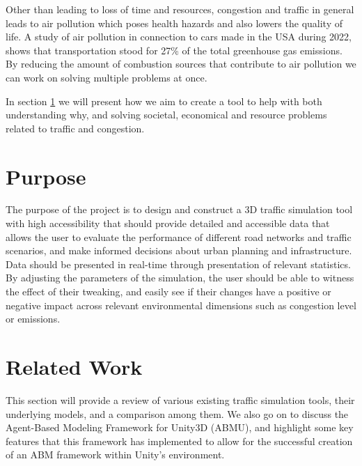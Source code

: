     Other than leading to loss of time and resources, congestion and traffic in general leads to air pollution which poses health hazards and also lowers the quality of life\cite{urban_2004}. A study of air pollution in connection to cars made in the USA during 2022, shows that transportation stood for 27\% of the total greenhouse gas emissions\cite{treehugger_2022}. By reducing the amount of combustion sources that contribute to air pollution we can work on solving multiple problems at once.

    In section \ref{purpose} we will present how we aim to create a tool to help with both understanding why, and solving societal, economical and resource problems related to traffic and congestion.

\section{Purpose}\label{purpose}
    The purpose of the project is to design and construct a 3D traffic simulation tool with high accessibility that should provide detailed and accessible data that allows the user to evaluate the performance of different road networks and traffic scenarios, and make informed decisions about urban planning and infrastructure. Data should be presented in real-time through presentation of relevant statistics. By adjusting the parameters of the simulation, the user should be able to witness the effect of their tweaking, and easily see if their changes have a positive or negative impact across relevant environmental dimensions such as congestion level or emissions.

\section{Related Work} \label{Section_ref}
    This section will provide a review of various existing traffic simulation tools, their underlying models, and a comparison among them. We also go on to discuss the Agent-Based Modeling Framework for Unity3D (ABMU), and highlight some key features that this framework has implemented to allow for the successful creation of an ABM framework within Unity's environment.



